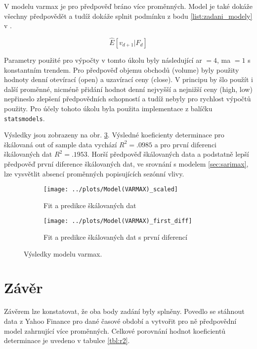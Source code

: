 \documentclass[a4paper,12pt, czech]{article}
\newcommand{\code}[1]{\texttt{#1}}
\begin{document}
V modelu \gls{varmax} je pro předpověď bráno více proměnných. Model je také dokáže všechny předpovědět a tudíž dokáže splnit podmínku z bodu \ref{list:zadani_modely} v .

\begin{equation}\label{eq:varimax}
\hat{E}\left[v_{d+1}|F_d\right]
\end{equation}

Parametry použité pro výpočty v tomto úkolu byly následující \gls{ar} $= 4$, \gls{ma} $= 1$ s konstantním trendem.
Pro předpověď objemu obchodů (volume) byly použity hodnoty denní otevírací (open) a uzavírací ceny (close).
V principu by šlo použít i další proměnné, nicméně přidání hodnot denní nejvyšší a nejnižší ceny (high, low) nepřineslo zlepšení předpovědních schopností a tudíž nebyly pro rychlost výpočtů použity.
Pro účely tohoto úkolu byla použita implementace z balíčku \code{statsmodels}.

Výsledky jsou zobrazeny na obr. \ref{fig:varmax}.
Výsledné koeficienty determinace pro škálovaná out of sample data vychází $R^2=\num{.0985}$ a pro první diferenci škálovaných dat $R^2=\num{.1953}$.
Horší předpověď škálovaných data a podstatně lepší předpověď první diference škálovaných dat, ve srovnání s modelem \ref{sec:sarimax}, lze vysvětlit absencí proměnných popisujících sezónní vlivy.

\begin{figure}[htb]
	\begin{subfigure}[t]{.5\linewidth}
		\centering
		\texttt{[image: ../plots/Model(VARMAX)\_scaled]}
		\caption{Fit a predikce škálovaných dat}
		\label{fig:varmax_scaled}
	\end{subfigure}
	\begin{subfigure}[t]{.5\linewidth}
		\centering
		\texttt{[image: ../plots/Model(VARMAX)\_first\_diff]}
		\caption{Fit a predikce škálovaných dat s první diferencí}
		\label{fig:varmax_fd}
	\end{subfigure}
	\caption{Výsledky modelu \gls{varmax}.}\label{fig:varmax}
\end{figure}

\clearpage

\section{Závěr}

Závěrem lze konstatovat, že oba body zadání byly splněny.
Povedlo se stáhnout data z Yahoo Finance pro dané časové období a vytvořit pro ně předpovědní model zahrnující více proměnných.
Celkové porovnání hodnot koeficientů determinace je uvedeno v tabulce \ref{tbl:r2}.
\end{document}
